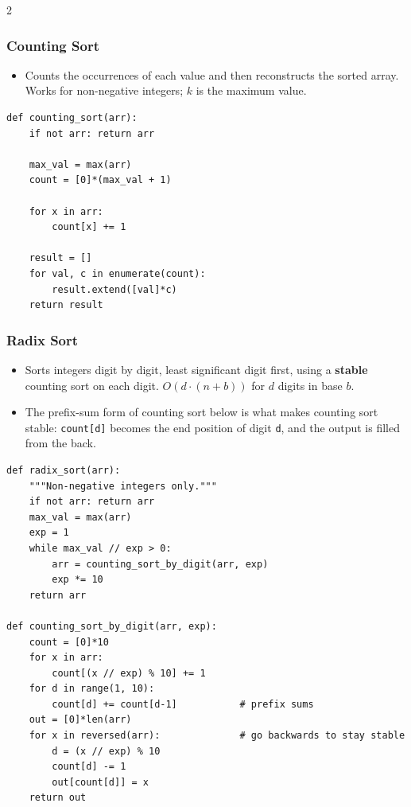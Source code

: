 \documentclass[9pt,a4paper]{extarticle}
\begin{document}
\begin{multicols}{2}
\subsubsection{Counting Sort}

\begin{itemize}
\item Counts the occurrences of each value and then reconstructs the sorted array. Works for non-negative integers; $k$ is the maximum value.
\end{itemize}

\begin{lstlisting}
def counting_sort(arr):
    if not arr: return arr

    max_val = max(arr)
    count = [0]*(max_val + 1)

    for x in arr:
        count[x] += 1

    result = []
    for val, c in enumerate(count):
        result.extend([val]*c)
    return result
\end{lstlisting}

\subsubsection{Radix Sort}

\begin{itemize}
\item Sorts integers digit by digit, least significant digit first, using a \textbf{stable} counting sort on each digit. $O(d \cdot (n + b))$ for $d$ digits in base $b$.
\item The prefix-sum form of counting sort below is what makes counting sort stable: \texttt{count[\allowbreak{}d]} becomes the end position of digit \texttt{d}, and the output is filled from the back.
\end{itemize}

\begin{lstlisting}
def radix_sort(arr):
    """Non-negative integers only."""
    if not arr: return arr
    max_val = max(arr)
    exp = 1
    while max_val // exp > 0:
        arr = counting_sort_by_digit(arr, exp)
        exp *= 10
    return arr

def counting_sort_by_digit(arr, exp):
    count = [0]*10
    for x in arr:
        count[(x // exp) % 10] += 1
    for d in range(1, 10):
        count[d] += count[d-1]           # prefix sums
    out = [0]*len(arr)
    for x in reversed(arr):              # go backwards to stay stable
        d = (x // exp) % 10
        count[d] -= 1
        out[count[d]] = x
    return out
\end{lstlisting}


\end{multicols}
\end{document}
